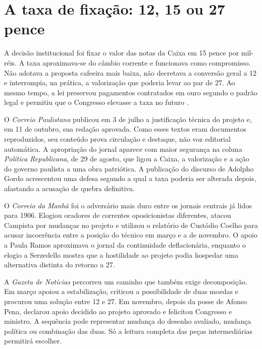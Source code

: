 \section{A taxa de fixação: 12, 15 ou 27 pence}

A decisão institucional foi fixar o valor das notas da Caixa em 15 pence por mil-réis. A taxa aproximava-se do câmbio corrente e funcionava como compromisso. Não adotava a proposta cafeeira mais baixa, não decretava a conversão geral a 12 e interrompia, na prática, a valorização que poderia levar ao par de 27. Ao mesmo tempo, a lei preservou pagamentos contratados em ouro segundo o padrão legal e permitiu que o Congresso elevasse a taxa no futuro \cite{brasil1906caixa}.

O \textit{Correio Paulistano} publicou em 3 de julho a justificação técnica do projeto e, em 11 de outubro, sua redação aprovada. Como esses textos eram documentos reproduzidos, seu conteúdo prova circulação e destaque, não voz editorial automática. A apropriação do jornal aparece com maior segurança na coluna \textit{Política Republicana}, de 29 de agosto, que ligou a Caixa, a valorização e a ação do governo paulista a uma obra patriótica. A publicação do discurso de Adolpho Gordo acrescentou uma defesa segundo a qual a taxa poderia ser alterada depois, afastando a acusação de quebra definitiva.


O \textit{Correio da Manhã} foi o adversário mais duro entre os jornais centrais já lidos para 1906. Elogiou oradores de correntes oposicionistas diferentes, atacou Campista por mudanças no projeto e utilizou o relatório de Custódio Coelho para acusar incoerência entre a posição do técnico em março e a de novembro. O apoio a Paula Ramos aproximava o jornal da continuidade deflacionária, enquanto o elogio a Serzedello mostra que a hostilidade ao projeto podia hospedar uma alternativa distinta do retorno a 27.


A \textit{Gazeta de Notícias} percorreu um caminho que também exige decomposição. Em março apoiou a estabilização, criticou a possibilidade de duas moedas e procurou uma solução entre 12 e 27. Em novembro, depois da posse de Afonso Pena, declarou apoio decidido ao projeto aprovado e felicitou Congresso e ministro. A sequência pode representar mudança do desenho avaliado, mudança política ou combinação das duas. Só a leitura completa das peças intermediárias permitirá escolher.

